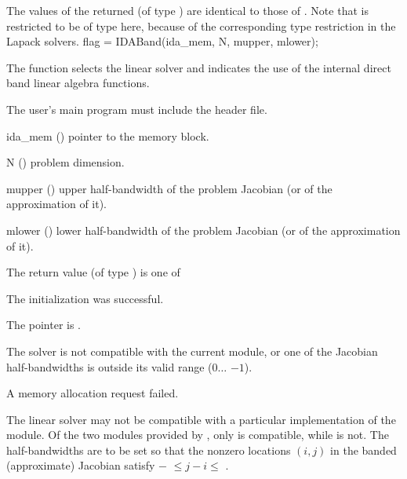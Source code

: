 {
  The values of the returned  (of type ) are identical
  to those of .
}
{
  Note that  is restricted to be of type  here, because
  of the corresponding type restriction in the Lapack solvers.
}
{
  flag = IDABand(ida\_mem, N, mupper, mlower);
}
{
  The function  selects the {\idaband} linear solver and indicates
  the use of the internal direct band linear algebra functions.

  The user's main program must include the  header file.
}
{
  \begin{args}
  \item[ida\_mem] ()
    pointer to the {\ida} memory block.
  \item[N] ()
    problem dimension.
  \item[mupper] ()
    upper half-bandwidth of the problem Jacobian (or of the approximation of it).
  \item[mlower] ()
    lower half-bandwidth of the problem Jacobian (or of the approximation of it).
  \end{args}
}
{
  The return value  (of type ) is one of
  \begin{args}
  \item[\Id{IDABAND\_SUCCESS}] 
    The {\idaband} initialization was successful.
  \item[\Id{IDABAND\_MEM\_NULL}]
    The  pointer is .
  \item[\Id{IDABAND\_ILL\_INPUT}]
    The {\idaband} solver is not compatible with the current {\nvector} module, or
    one of the Jacobian half-bandwidths is outside its valid range ($0 \ldots$
    $-1$).
  \item[\Id{IDABAND\_MEM\_FAIL}]
    A memory allocation request failed.
  \end{args}
}
{
  The {\idaband} linear solver may not be compatible with a particular
  implementation of the {\nvector} module. Of the two {\nvector} modules 
  provided by {\sundials}, only {\nvecs} is compatible, while {\nvecp} is not.
  The half-bandwidths are to be set so that the nonzero locations $(i,j)$ in the
  banded (approximate) Jacobian satisfy $-$ $\leq j-i \leq$ .
}
